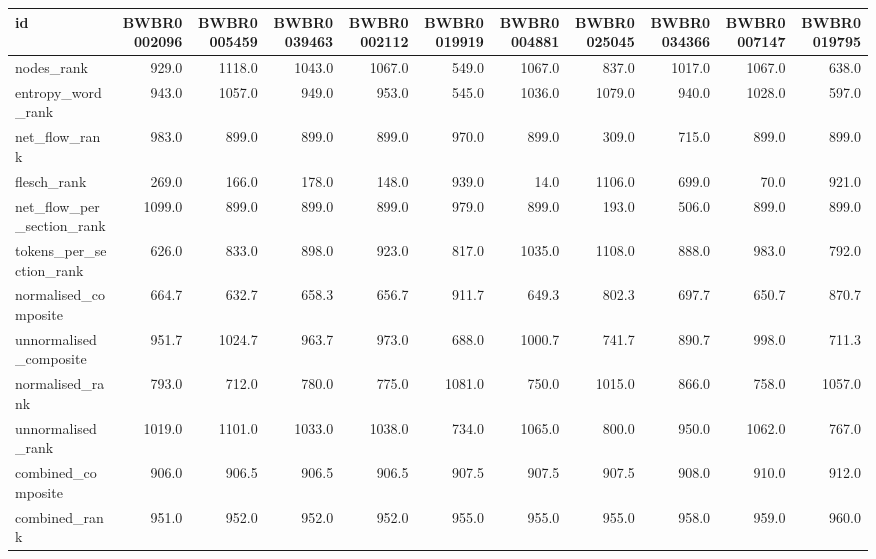 \begin{tabular}{lrrrrrrrrrr}
\toprule
id & BWBR0002096 & BWBR0005459 & BWBR0039463 & BWBR0002112 & BWBR0019919 & BWBR0004881 & BWBR0025045 & BWBR0034366 & BWBR0007147 & BWBR0019795 \\
\midrule
nodes\_rank & 929.0 & 1118.0 & 1043.0 & 1067.0 & 549.0 & 1067.0 & 837.0 & 1017.0 & 1067.0 & 638.0 \\
\cline{1-11}
entropy\_word\_rank & 943.0 & 1057.0 & 949.0 & 953.0 & 545.0 & 1036.0 & 1079.0 & 940.0 & 1028.0 & 597.0 \\
\cline{1-11}
net\_flow\_rank & 983.0 & 899.0 & 899.0 & 899.0 & 970.0 & 899.0 & 309.0 & 715.0 & 899.0 & 899.0 \\
\cline{1-11}
flesch\_rank & 269.0 & 166.0 & 178.0 & 148.0 & 939.0 & 14.0 & 1106.0 & 699.0 & 70.0 & 921.0 \\
\cline{1-11}
net\_flow\_per\_section\_rank & 1099.0 & 899.0 & 899.0 & 899.0 & 979.0 & 899.0 & 193.0 & 506.0 & 899.0 & 899.0 \\
\cline{1-11}
tokens\_per\_section\_rank & 626.0 & 833.0 & 898.0 & 923.0 & 817.0 & 1035.0 & 1108.0 & 888.0 & 983.0 & 792.0 \\
\cline{1-11}
normalised\_composite & 664.7 & 632.7 & 658.3 & 656.7 & 911.7 & 649.3 & 802.3 & 697.7 & 650.7 & 870.7 \\
\cline{1-11}
unnormalised\_composite & 951.7 & 1024.7 & 963.7 & 973.0 & 688.0 & 1000.7 & 741.7 & 890.7 & 998.0 & 711.3 \\
\cline{1-11}
normalised\_rank & 793.0 & 712.0 & 780.0 & 775.0 & 1081.0 & 750.0 & 1015.0 & 866.0 & 758.0 & 1057.0 \\
\cline{1-11}
unnormalised\_rank & 1019.0 & 1101.0 & 1033.0 & 1038.0 & 734.0 & 1065.0 & 800.0 & 950.0 & 1062.0 & 767.0 \\
\cline{1-11}
combined\_composite & 906.0 & 906.5 & 906.5 & 906.5 & 907.5 & 907.5 & 907.5 & 908.0 & 910.0 & 912.0 \\
\cline{1-11}
combined\_rank & 951.0 & 952.0 & 952.0 & 952.0 & 955.0 & 955.0 & 955.0 & 958.0 & 959.0 & 960.0 \\
\cline{1-11}
\bottomrule
\end{tabular}
